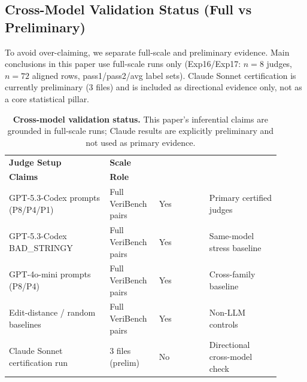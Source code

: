 \documentclass[numbers]{article}
\begin{document}
\subsection{Cross-Model Validation Status (Full vs Preliminary)}
To avoid over-claiming, we separate full-scale and preliminary evidence.
Main conclusions in this paper use full-scale runs only (Exp16/Exp17: \(n=8\) judges, \(n=72\) aligned rows, pass1/pass2/avg label sets).
Claude Sonnet certification is currently preliminary (\(3\) files) and is included as directional evidence only, not as a core statistical pillar.

\begin{table}[t]
  \centering
  \small
  \begin{tabular}{p{0.34\linewidth}p{0.15\linewidth}p{0.17\linewidth}p{0.24\linewidth}}
    \toprule
    \textbf{Judge Setup}             & \textbf{Scale}       & \makecell[c]{\textbf{In Main}                                 \\\textbf{Claims}} & \textbf{Role} \\
    \midrule
    GPT-5.3-Codex prompts (P8/P4/P1) & Full VeriBench pairs & Yes                           & Primary certified judges      \\
    GPT-5.3-Codex BAD\_STRINGY       & Full VeriBench pairs & Yes                           & Same-model stress baseline    \\
    GPT-4o-mini prompts (P8/P4)      & Full VeriBench pairs & Yes                           & Cross-family baseline         \\
    Edit-distance / random baselines & Full VeriBench pairs & Yes                           & Non-LLM controls              \\
    Claude Sonnet certification run  & 3 files (prelim)     & No                            & Directional cross-model check \\
    \bottomrule
  \end{tabular}
  \caption{\textbf{Cross-model validation status.}
    This paper's inferential claims are grounded in full-scale runs; Claude results are explicitly preliminary and not used as primary evidence.}
  \label{tab:app-cross-model-status}
\end{table}
\end{document}
